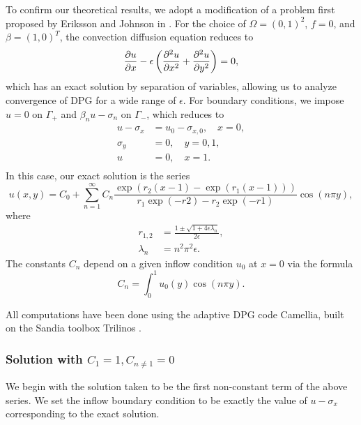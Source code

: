 To confirm our theoretical results, we adopt a modification of a problem first proposed by Eriksson and Johnson in \cite{Eriksson1993}. For the choice of $\Omega = (0,1)^2$, $f=0$, and $\beta = (1,0)^T$, the convection diffusion equation reduces to
\[
\pd{u}{x} - \epsilon \left(\pdd{u}{x}+ \pdd{u}{y}\right) = 0,
\]
which has an exact solution by separation of variables, allowing us to analyze convergence of DPG for a wide range of $\epsilon$.  For boundary conditions, we impose $u=0$ on $\Gamma_+$ and $\beta_n u - \sigma_n$ on $\Gamma_-$, which reduces to
\begin{align*}
u-\sigma_x &= u_0-\sigma_{x,0}, \quad x=0,\\
\sigma_y &=  0, \quad y=0,1,\\
u &= 0, \quad x=1.\\
\end{align*}
In this case, our exact solution is the series
\[
u(x,y) = C_0 + \sum_{n=1}^\infty C_n \frac{\exp(r_2(x-1)-\exp(r_1(x-1)))}{r_1\exp(-r2) - r_2\exp(-r1)}\cos(n\pi y),
\]
where
\begin{align*}
r_{1,2} &= \frac{1 \pm \sqrt{1 + 4 \epsilon\lambda_n}}{2 \epsilon},\\
\lambda_n &= n^2\pi^2 \epsilon.
\end{align*}
The constants $C_n$ depend on a given inflow condition $u_0$ at $x=0$ via the formula
\[
C_n = \int_0^1 u_0(y) \cos(n\pi y).
\]

All computations have been done using the adaptive DPG code Camellia, built on the Sandia toolbox Trilinos \cite{Camellia}.

\subsubsection{Solution with $C_1 = 1, C_{n\neq 1} = 0$}

We begin with the solution taken to be the first non-constant term of the above series.  We set the inflow boundary condition to be exactly the value of $u-\sigma_x$ corresponding to the exact solution.  

